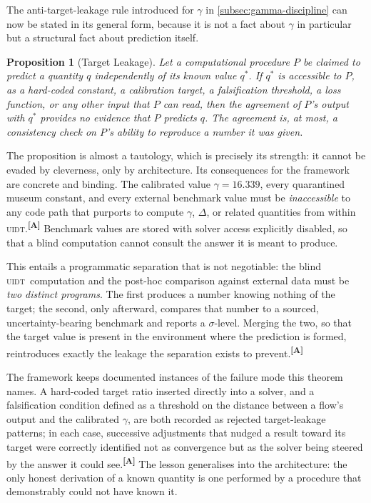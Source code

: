 \documentclass[12pt,a4paper,twoside]{article}
\theoremstyle{plain}
\newtheorem{proposition}[theorem]{Proposition}
\theoremstyle{definition}
\theoremstyle{remark}
\newcommand{\UIDT}{\textsc{uidt}}
\newcommand{\catmark}[1]{\textsuperscript{\textsf{\textbf{[#1]}}}}
\begin{document}
The anti-target-leakage rule introduced for $\gamma$ in \cref{subsec:gamma-discipline} can now be stated in its general form, because it is not a fact about $\gamma$ in particular but a structural fact about prediction itself.

\begin{proposition}[Target Leakage]
\label{prop:target-leakage}
Let a computational procedure $P$ be claimed to predict a quantity $q$ independently of its known value $q^{\ast}$. If $q^{\ast}$ is accessible to $P$, as a hard-coded constant, a calibration target, a falsification threshold, a loss function, or any other input that $P$ can read, then the agreement of $P$'s output with $q^{\ast}$ provides no evidence that $P$ predicts $q$. The agreement is, at most, a consistency check on $P$'s ability to reproduce a number it was given.
\end{proposition}

\noindent The proposition is almost a tautology, which is precisely its strength: it cannot be evaded by cleverness, only by architecture. Its consequences for the framework are concrete and binding. The calibrated value $\gamma = 16.339$, every quarantined museum constant, and every external benchmark value must be \emph{inaccessible} to any code path that purports to compute $\gamma$, $\Delta$, or related quantities from within \UIDT.\catmark{A} Benchmark values are stored with solver access explicitly disabled, so that a blind computation cannot consult the answer it is meant to produce.

This entails a programmatic separation that is not negotiable: the blind \UIDT\ computation and the post-hoc comparison against external data must be \emph{two distinct programs}. The first produces a number knowing nothing of the target; the second, only afterward, compares that number to a sourced, uncertainty-bearing benchmark and reports a $\sigma$-level. Merging the two, so that the target value is present in the environment where the prediction is formed, reintroduces exactly the leakage the separation exists to prevent.\catmark{A}

The framework keeps documented instances of the failure mode this theorem names. A hard-coded target ratio inserted directly into a solver, and a falsification condition defined as a threshold on the distance between a flow's output and the calibrated $\gamma$, are both recorded as rejected target-leakage patterns; in each case, successive adjustments that nudged a result toward its target were correctly identified not as convergence but as the solver being steered by the answer it could see.\catmark{A} The lesson generalises into the architecture: the only honest derivation of a known quantity is one performed by a procedure that demonstrably could not have known it.
\end{document}
